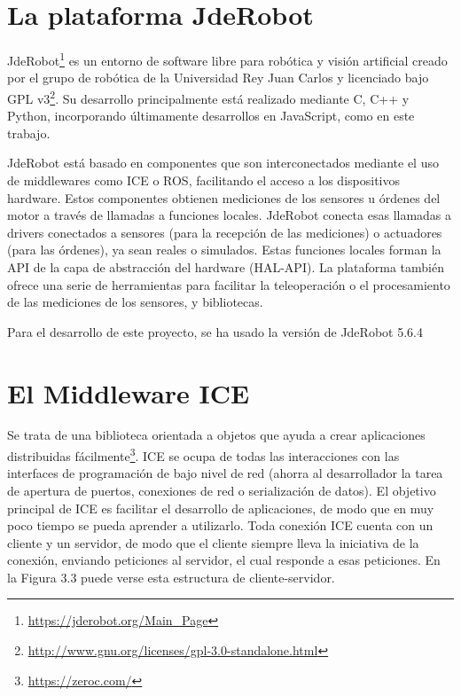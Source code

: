 \section{La plataforma JdeRobot}
JdeRobot\footnote{\url{https://jderobot.org/Main_Page}} es un entorno de software libre para robótica y visión artificial creado por el grupo de robótica de la Universidad Rey Juan Carlos y licenciado bajo GPL v3\footnote{\url{http://www.gnu.org/licenses/gpl-3.0-standalone.html}}. Su desarrollo principalmente está realizado mediante C, C++ y Python, incorporando últimamente desarrollos en JavaScript, como en este trabajo.

JdeRobot está basado en componentes que son interconectados mediante el uso de middlewares como ICE o ROS, facilitando el acceso a los dispositivos hardware. Estos componentes obtienen mediciones  de los sensores u órdenes del motor a través de llamadas a funciones locales. JdeRobot conecta esas llamadas a drivers conectados a sensores (para la recepción de las mediciones) o actuadores (para las órdenes), ya sean reales o simulados. Estas funciones locales forman la API de la capa de abstracción del hardware (HAL-API). La plataforma también ofrece una serie de herramientas para facilitar la teleoperación o el procesamiento de las mediciones de los sensores, y bibliotecas.

Para el desarrollo de este proyecto, se ha usado la versión de JdeRobot 5.6.4

\section{El Middleware ICE}
Se trata de una biblioteca orientada a objetos que ayuda a crear aplicaciones distribuidas fácilmente\footnote{\url{https://zeroc.com/}}. ICE se ocupa de todas las interacciones con las interfaces de programación de bajo nivel de red (ahorra al desarrollador la tarea de apertura de puertos, conexiones de red o serialización de datos). El objetivo principal de ICE es facilitar el desarrollo de aplicaciones, de modo que en muy poco tiempo se pueda aprender a utilizarlo. Toda conexión ICE cuenta con un cliente y un servidor, de modo que el cliente siempre lleva la iniciativa de la conexión, enviando peticiones al servidor, el cual responde a esas peticiones. En la Figura 3.3 puede verse esta estructura de cliente-servidor.

